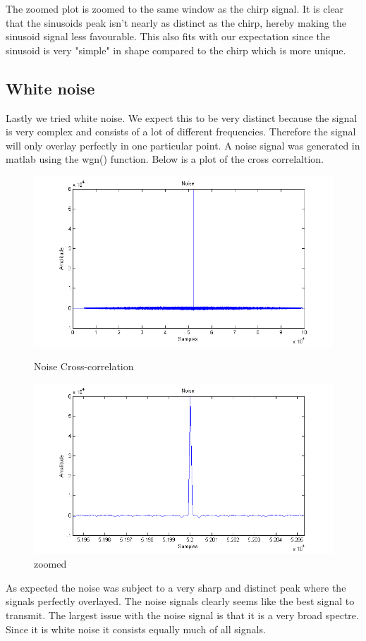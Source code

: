 The zoomed plot is zoomed to the same window as the chirp signal. It is clear that the sinusoids peak isn't nearly as distinct as the chirp, hereby making the sinusoid signal less favourable. This also fits with our expectation since the sinusoid is very "simple" in shape compared to the chirp which is more unique.\\
\subsection{White noise}
Lastly we tried white noise. We expect this to be very distinct because the signal is very complex and consists of a lot of different frequencies. Therefore the signal will only overlay perfectly in one particular point. A noise signal was generated in matlab using the wgn() function. Below is a plot of the cross correlaltion.\\
\begin{figure}[H]
\begin{minipage}[b]{0.49\linewidth}
\centering
\includegraphics[width=1\textwidth]{billeder/noise_xcorr_fig}
\caption{Noise Cross-correlation}
\label{fig:figure1}
\end{minipage}
\hspace{0.5cm}
\begin{minipage}[b]{0.49\linewidth}
\centering
\includegraphics[width=1\textwidth]{billeder/noise_xcorr_fig_zoom}
\caption{zoomed}
\label{fig:figure2}
\end{minipage}
\end{figure}
As expected the noise was subject to a very sharp and distinct peak where the signals perfectly overlayed. The noise signals clearly seems like the best signal to transmit. The largest issue with the noise signal is that it is a very broad spectre. Since it is white noise it consists equally much of all signals.\\
